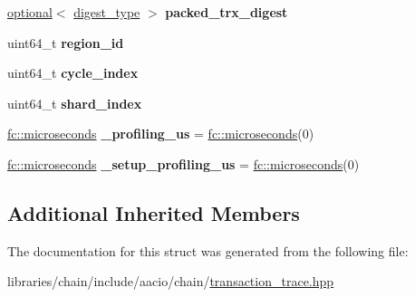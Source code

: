 \begin{DoxyCompactItemize}
\mbox{\hyperlink{classfc_1_1optional}{optional}}$<$ \mbox{\hyperlink{classfc_1_1sha256}{digest\+\_\+type}} $>$ {\bfseries packed\+\_\+trx\+\_\+digest}
\item 
\mbox{\label{structaacio_1_1chain_1_1transaction__trace_a0ef3a09815e56475487441398786576d}} 
uint64\+\_\+t {\bfseries region\+\_\+id}
\item 
\mbox{\label{structaacio_1_1chain_1_1transaction__trace_a29553c263cc2ec45a3139d244288a378}} 
uint64\+\_\+t {\bfseries cycle\+\_\+index}
\item 
\mbox{\label{structaacio_1_1chain_1_1transaction__trace_a0d0a241e91b6c09c6ce45f36a5aabca6}} 
uint64\+\_\+t {\bfseries shard\+\_\+index}
\item 
\mbox{\label{structaacio_1_1chain_1_1transaction__trace_a4f51816dcdbca5fbf703a4dc33ecf678}} 
\mbox{\hyperlink{classfc_1_1microseconds}{fc\+::microseconds}} {\bfseries \+\_\+profiling\+\_\+us} = \mbox{\hyperlink{classfc_1_1microseconds}{fc\+::microseconds}}(0)
\item 
\mbox{\label{structaacio_1_1chain_1_1transaction__trace_a267e338b4641daed5dbb2bfb6d84f940}} 
\mbox{\hyperlink{classfc_1_1microseconds}{fc\+::microseconds}} {\bfseries \+\_\+setup\+\_\+profiling\+\_\+us} = \mbox{\hyperlink{classfc_1_1microseconds}{fc\+::microseconds}}(0)
\end{DoxyCompactItemize}
\subsection*{Additional Inherited Members}


The documentation for this struct was generated from the following file\+:\begin{DoxyCompactItemize}
\item 
libraries/chain/include/aacio/chain/\mbox{\hyperlink{transaction__trace_8hpp}{transaction\+\_\+trace.\+hpp}}\end{DoxyCompactItemize}
